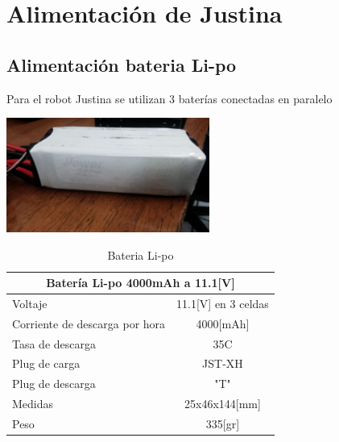 \documentclass[user_manual.tex]{subfiles}
\begin{document}
\section{Alimentación de Justina}

\subsection{Alimentación bateria Li-po}

Para el robot Justina se utilizan 3 baterías conectadas en paralelo

\begin{center}
\includegraphics[width=0.5\textwidth]{Figures/Hardware/Partes/Li-po_Battery.jpg}
\label{fig:Hardware:Partes:Battery}
\end{center}

\begin{table}[H]
\begin{center}
\begin{tabular}{|l|l|}%

\hline
\multicolumn{2}{|c|}{Batería Li-po 4000mAh a 11.1[V]} \\ \hline %
Voltaje &  \multicolumn{1}{|c|}{11.1[V] en 3 celdas}\\ \hline
Corriente de descarga por hora  & \multicolumn{1}{|c|}{4000[mAh]}\\ \hline
Tasa de descarga & \multicolumn{1}{|c|}{35C}\\ \hline
Plug de carga & \multicolumn{1}{|c|}{JST-XH}\\ \hline
Plug de descarga & \multicolumn{1}{|c|}{"T"}\\ \hline
Medidas & \multicolumn{1}{|c|}{25x46x144[mm]}\\ \hline
Peso & \multicolumn{1}{|c|}{335[gr]}\\ \hline

\end{tabular}
\caption{Bateria Li-po}
\label{Battery}
\end{center}
\end{table}
\end{document}
